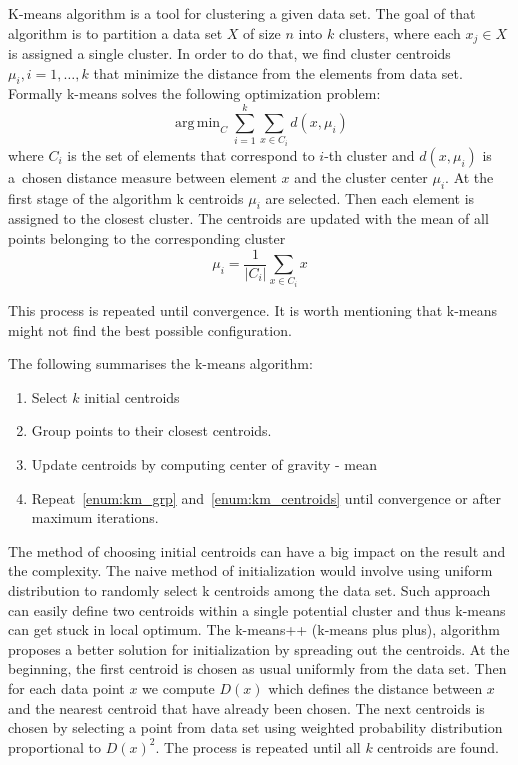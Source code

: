 \documentclass{mini}
\DeclareMathOperator*{\argmin}{arg\,min} %
\begin{document}
K-means algorithm is a tool for clustering a given data set.
The goal of that algorithm is to partition a data set $X$ of size $n$ into $k$ clusters, where each $x_{j}\in X$ is assigned a single cluster. In order to do that, we find cluster centroids $\mu_{i}, i=1,\ldots,k$ that minimize the distance from the elements from data set. Formally k-means solves the following optimization problem:
\begin{equation}
    \argmin_{C}\sum_{i=1}^{k}\sum_{x\in C_{i}} d(x,\mu_{i})
\end{equation}
where $C_{i}$ is the set of elements that correspond to $i$-th cluster and $d(x,\mu_{i})$ is a~chosen distance measure between element $x$ and the cluster center $\mu_{i}$. At the first stage of the algorithm k centroids $\mu_{i}$ are selected. Then each element is assigned to the closest cluster. The centroids are updated with the mean of all points belonging to the corresponding cluster
\begin{equation}
    \mu_{i} = \frac{1}{|C_{i}|} \sum_{x\in C_{i}} x
\end{equation}

This process is repeated until convergence. It is worth mentioning that k-means might not find the best possible 
configuration.

The following summarises the k-means algorithm:

\begin{center}
    
    
    \begin{enumerate}
        \item 
        Select $k$ initial centroids
        \item \label{enum:km_grp} 
        Group points to their closest centroids.
        \item \label{enum:km_centroids} 
        Update centroids by computing center of gravity - mean
        \item 
        Repeat~\ref{enum:km_grp} and~\ref{enum:km_centroids} until convergence or after maximum iterations.
    \end{enumerate}
    
\end{center}

The method of choosing initial centroids can have a big impact on the result and the complexity. The naive method of initialization would involve using uniform distribution to randomly select k centroids among the data set. Such approach can easily define two centroids within a single potential cluster and thus k-means can get stuck in local optimum.
The k-means++ (k-means plus plus), algorithm proposes a better solution for initialization by spreading out the centroids. At the beginning, the first centroid is chosen as usual uniformly from the data set. Then for each data point $x$ we compute $D(x)$ which defines the distance between $x$ and the nearest centroid that have already been chosen. The next centroids is chosen by selecting a point from data set using weighted probability distribution proportional to $D(x)^2$. The process is repeated until all $k$ centroids are found.
\end{document}
